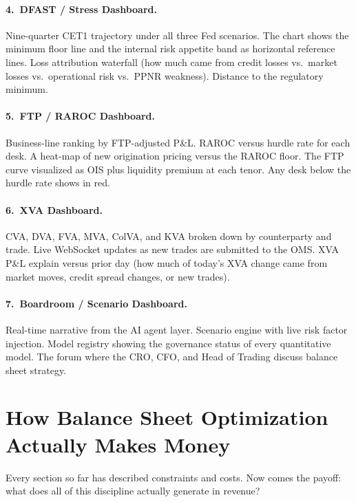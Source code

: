 \documentclass[12pt,a4paper]{article}
\begin{document}
\paragraph{4.\ DFAST / Stress Dashboard.}
Nine-quarter CET1 trajectory under all three Fed scenarios.  The chart shows
the minimum floor line and the internal risk appetite band as horizontal
reference lines.  Loss attribution waterfall (how much came from credit
losses vs.\ market losses vs.\ operational risk vs.\ PPNR weakness).
Distance to the regulatory minimum.

\paragraph{5.\ FTP / RAROC Dashboard.}
Business-line ranking by FTP-adjusted P\&L.  RAROC versus hurdle rate for
each desk.  A heat-map of new origination pricing versus the RAROC floor.
The FTP curve visualized as OIS plus liquidity premium at each tenor.
Any desk below the hurdle rate shows in red.

\paragraph{6.\ XVA Dashboard.}
CVA, DVA, FVA, MVA, ColVA, and KVA broken down by counterparty and trade.
Live WebSocket updates as new trades are submitted to the OMS.
XVA P\&L explain versus prior day (how much of today's XVA change came
from market moves, credit spread changes, or new trades).

\paragraph{7.\ Boardroom / Scenario Dashboard.}
Real-time narrative from the AI agent layer.  Scenario engine with live
risk factor injection.  Model registry showing the governance status of
every quantitative model.  The forum where the CRO, CFO, and Head of Trading
discuss balance sheet strategy.

\section{How Balance Sheet Optimization Actually Makes Money}

Every section so far has described constraints and costs.  Now comes the
payoff: what does all of this discipline actually generate in revenue?
\end{document}
